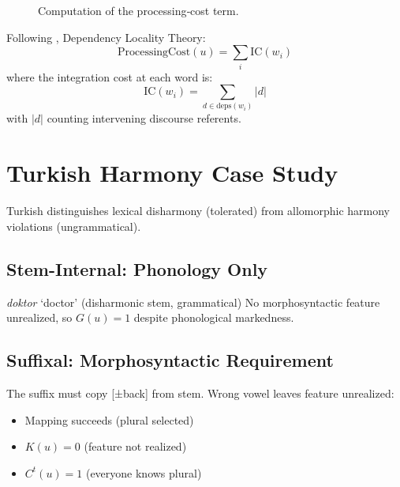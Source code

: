 \documentclass[12pt]{article}
\begin{document}
\begin{figure}[h]
\centering
{}
\caption{Computation of the processing‑cost term.\label{fig:proc-cost}}
\end{figure}

Following \textcite{gibson2000}, Dependency Locality Theory:
\[
\text{ProcessingCost}(u) = \sum_{i} \text{IC}(w_i)
\]
where the integration cost at each word is:
\[
\text{IC}(w_i) = \sum_{d \in \text{deps}(w_i)} |d|
\]
with $|d|$ counting intervening discourse referents.

\section{Turkish Harmony Case Study}

Turkish distinguishes lexical disharmony (tolerated) from allomorphic harmony violations (ungrammatical).

\subsection{Stem-Internal: Phonology Only}

\ea
\textit{doktor} `doctor' (disharmonic stem, grammatical)
\z
No morphosyntactic feature unrealized, so $G(u) = 1$ despite phonological markedness.

\subsection{Suffixal: Morphosyntactic Requirement}

\ea
{}
\z
\z
The suffix must copy [±back] from stem. Wrong vowel leaves feature unrealized:
\begin{itemize}
\item Mapping succeeds (plural selected)
\item $K(u) = 0$ (feature not realized)
\item $C^t(u) = 1$ (everyone knows plural)
\end{itemize}
\end{document}
